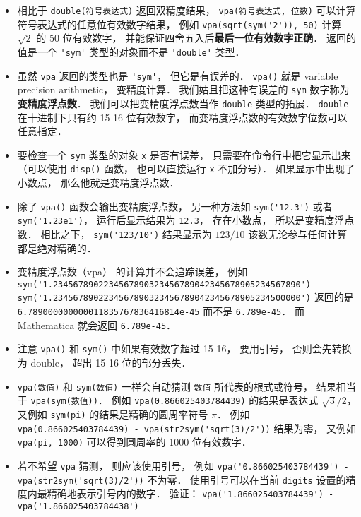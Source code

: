 \begin{itemize}
\item 相比于 \verb|double(符号表达式)| 返回双精度结果， \verb|vpa(符号表达式, 位数)| 可以计算符号表达式的任意位有效数字结果， 例如 \verb|vpa(sqrt(sym('2')), 50)| 计算 $\sqrt{2}$ 的 50 位有效数字， 并能保证四舍五入后\textbf{最后一位有效数字正确}． 返回的值是一个 \verb|'sym'| 类型的对象而不是 \verb|'double'| 类型．

\item 虽然 \verb|vpa| 返回的类型也是 \verb|'sym'|， 但它是有误差的． \verb|vpa()| 就是 variable precision arithmetic， 变精度计算． 我们姑且把这种有误差的 \verb|sym| 数字称为\textbf{变精度浮点数}． 我们可以把变精度浮点数当作 \verb|double| 类型的拓展． \verb|double| 在十进制下只有约 15-16 位有效数字， 而变精度浮点数的有效数字位数可以任意指定．

\item 要检查一个 \verb|sym| 类型的对象 \verb|x| 是否有误差， 只需要在命令行中把它显示出来（可以使用 \verb|disp()| 函数， 也可以直接运行 \verb|x| 不加分号）． 如果显示中出现了小数点， 那么他就是变精度浮点数．

\item 除了 \verb|vpa()| 函数会输出变精度浮点数， 另一种方法如 \verb|sym('12.3')| 或者 \verb|sym('1.23e1')|， 运行后显示结果为 \verb|12.3|， 存在小数点， 所以是变精度浮点数． 相比之下， \verb|sym('123/10')| 结果显示为 $123/10$ 该数无论参与任何计算都是绝对精确的．

\item 变精度浮点数（vpa） 的计算并不会追踪误差， 例如 \verb|sym('1.2345678902234567890323456789042345678905234567890') - sym('1.2345678902234567890323456789042345678905234500000')| 返回的是 \verb|6.789000000000011835767836416814e-45| 而不是 \verb|6.789e-45|． 而 Mathematica 就会返回 \verb|6.789e-45|．

\item 注意 \verb|vpa()| 和 \verb|sym()| 中如果有效数字超过 15-16， 要用引号， 否则会先转换为 double， 超出 15-16 位的部分丢失．

\item \verb|vpa(数值)| 和 \verb|sym(数值)| 一样会自动猜测 \verb|数值| 所代表的根式或符号， 结果相当于 \verb|vpa(sym(数值))|． 例如 \verb|vpa(0.866025403784439)| 的结果是表达式 $\sqrt{3}/2$， 又例如 \verb|sym(pi)| 的结果是精确的圆周率符号 $\pi$． 例如 \verb|vpa(0.866025403784439) - vpa(str2sym('sqrt(3)/2'))| 结果为零， 又例如 \verb|vpa(pi, 1000)| 可以得到圆周率的 1000 位有效数字．

\item  若不希望 \verb|vpa| 猜测， 则应该使用引号， 例如 \verb|vpa('0.866025403784439') - vpa(str2sym('sqrt(3)/2'))| 不为零． 使用引号可以在当前 \verb|digits| 设置的精度内最精确地表示引号内的数字． 验证： \verb|vpa('1.866025403784439') - vpa('1.866025403784438')|


\end{itemize}
